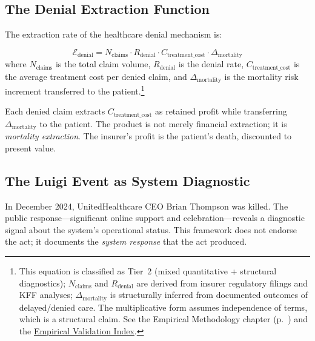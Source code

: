 \subsection{The Denial Extraction Function}

The extraction rate of the healthcare denial mechanism is:

\begin{equation}\label{eq:denial-extraction}
\mathcal{E}_{\text{denial}} = N_{\text{claims}} \cdot R_{\text{denial}} \cdot C_{\text{treatment\_cost}} \cdot \Delta_{\text{mortality}}
\end{equation}
where $N_{\text{claims}}$ is the total claim volume, $R_{\text{denial}}$ is the denial rate, $C_{\text{treatment\_cost}}$ is the average treatment cost per denied claim, and $\Delta_{\text{mortality}}$ is the mortality risk increment transferred to the patient.\footnote{This equation is classified as Tier~2 (mixed quantitative + structural diagnostics); $N_{\text{claims}}$ and $R_{\text{denial}}$ are derived from insurer regulatory filings and KFF analyses; $\Delta_{\text{mortality}}$ is structurally inferred from documented outcomes of delayed/denied care. The multiplicative form assumes independence of terms, which is a structural claim. See the Empirical Methodology chapter (p.~\pageref{ch:empirical_methodology}) and the \hyperref[app:empirical_index]{Empirical Validation Index}.}

Each denied claim extracts $C_{\text{treatment\_cost}}$ as retained profit while transferring $\Delta_{\text{mortality}}$ to the patient. The product is not merely financial extraction; it is \textit{mortality extraction}. The insurer's profit is the patient's death, discounted to present value.

\subsection{The Luigi Event as System Diagnostic}

In December 2024, UnitedHealthcare CEO Brian Thompson was killed. The public response---significant online support and celebration---reveals a diagnostic signal about the system's operational status. This framework does not endorse the act; it documents the \textit{system response} that the act produced.

